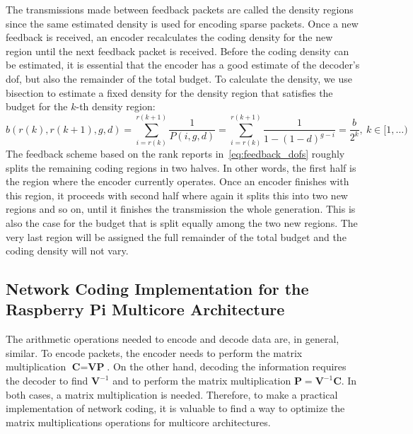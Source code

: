 The transmissions made between feedback packets are called the density
regions since the same estimated density is used for encoding sparse
packets. Once a new feedback is received, an encoder recalculates the
coding density for the new region until the next feedback packet is
received. Before the coding density can be estimated, it is essential
that the encoder has a good estimate of the decoder's \ac{dof}, but also
the remainder of the total budget. To calculate the density, we use
bisection to estimate a fixed density for the density region that
satisfies the budget for the $k$-th density region:
\begin{equation}
b(r(k),r(k+1),g,d) = \sum^{r(k+1)}_{i=r(k)} \frac{1}{P(i,g,d)} = \sum^{r(k+1)}_{i=r(k)} \frac{1}{1-(1-d)^{g-i}} = \frac{b}{2^k},\ k\in [1,\ldots)
\end{equation}
%
The feedback scheme based on the rank reports
in~\eqref{eq:feedback_dofs} roughly splits the remaining coding
regions in two halves. In other words, the first half is the region
where the encoder currently operates. Once an encoder finishes with
this region, it proceeds with second half where again it splits this
into two new regions and so on, until it finishes the transmission the
whole generation. This is also the case for the budget that is split
equally among the two new regions. The very last region will be
assigned the full remainder of the total budget and the coding density
will not vary.

\subsection{Network Coding Implementation for the Raspberry Pi Multicore
Architecture}
\label{sub:implementation-multicore}

The arithmetic operations needed to encode and decode data are, in
general, similar. To encode packets, the encoder needs to perform the
matrix multiplication $\textbf{C} = \textbf{V} \textbf{P}$. On the
other hand, decoding the information requires the decoder to find
$\textbf{V}^{-1}$ and to perform the matrix multiplication
$\textbf{P} = \textbf{V}^{-1} \textbf{C}$. In both cases, a matrix
multiplication is needed. Therefore, to make a practical
implementation of network coding, it is valuable to find a way to
optimize the matrix multiplications operations for multicore
architectures.

